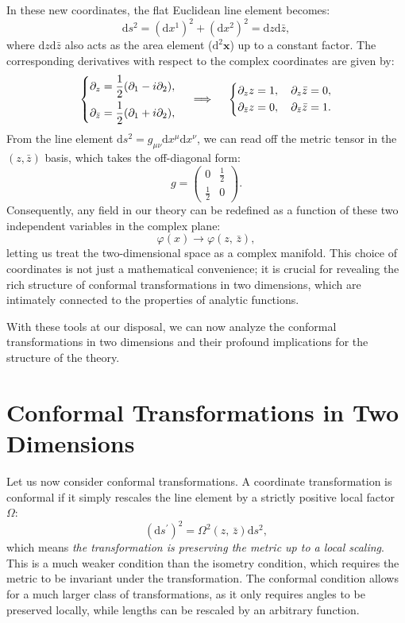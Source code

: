In these new coordinates, the flat Euclidean line element becomes:
\[
    \mathrm{d} s^2 = (\mathrm{d} x^1)^2 + (\mathrm{d} x^2)^2 = \mathrm{d} z \mathrm{d} \bar{z},
\]
where \(\mathrm{d} z \mathrm{d} \bar{z}\) also acts as the area element (\(\mathrm{d}^2 \mathbf{x}\)) up to a constant factor. The corresponding derivatives with respect to the complex coordinates are given by:
\[
    \begin{dcases}
        \partial_z = \frac{1}{2}(\partial_1 - i \partial_2), \\
        \partial_{\bar{z}} = \frac{1}{2}(\partial_1 + i \partial_2),
    \end{dcases} \quad \implies \quad \begin{dcases}
        \partial_z z = 1, \quad \partial_z \bar{z} = 0, \\
        \partial_{\bar{z}} z = 0, \quad \partial_{\bar{z}} \bar{z} = 1.
    \end{dcases}
\]
From the line element \(\mathrm{d}s^2 = g_{\mu\nu}\mathrm{d}x^\mu \mathrm{d}x^\nu\), we can read off the metric tensor in the \((z, \bar{z})\) basis, which takes the off-diagonal form:
\[
    g = \begin{pmatrix}
        0            & \tfrac{1}{2} \\
        \tfrac{1}{2} & 0
    \end{pmatrix}.
\]
Consequently, any field in our theory can be redefined as a function of these two independent variables in the complex plane:
\[
    \varphi(x) \to \varphi(z, \, \bar{z}),
\]
letting us treat the two-dimensional space as a complex manifold. This choice of coordinates is not just a mathematical convenience; it is crucial for revealing the rich structure of conformal transformations in two dimensions, which are intimately connected to the properties of analytic functions.

With these tools at our disposal, we can now analyze the conformal transformations in two dimensions and their profound implications for the structure of the theory.

\section{Conformal Transformations in Two Dimensions}

Let us now consider conformal transformations. A coordinate transformation is conformal if it simply rescales the line element by a strictly positive local factor \(\Omega\):
\[
    (\mathrm{d}s^{\prime})^2 =  \Omega^2(z, \, \bar{z}) \mathrm{d} s^2,
\]
which means \textit{the transformation is preserving the metric up to a local scaling}. This is a much weaker condition than the isometry condition, which requires the metric to be invariant under the transformation. The conformal condition allows for a much larger class of transformations, as it only requires angles to be preserved locally, while lengths can be rescaled by an arbitrary function.

